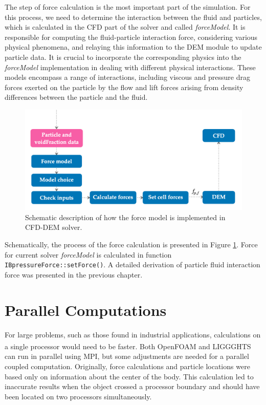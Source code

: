 The step of force calculation is the most important part of the simulation. For this process, we need to determine the interaction between the fluid and particles, which is calculated in the CFD part of the solver and called \textit{forceModel}. It is responsible for computing the fluid-particle interaction force, considering various physical phenomena, and relaying this information to the DEM module to update particle data. It is crucial to incorporate the corresponding physics into the \textit{forceModel} implementation in dealing with different physical interactions. These models encompass a range of interactions, including viscous and pressure drag forces exerted on the particle by the flow and lift forces arising from density differences between the particle and the fluid. 

\begin{figure}[!ht]
    \centering
    \includegraphics[width=15cm]{GWU_Thesis_Sarmakeeva/Images/chap3/force_model.png}
    \caption{Schematic description of how the force model is implemented in CFD-DEM solver.}
    \label{fig:force-model}
\end{figure}
Schematically, the process of the force calculation is presented in Figure \ref{fig:force-model}. Force for current solver \textit{forceModel} is calculated in function \verb|IBpressureForce::setForce()|. A detailed derivation of particle fluid interaction force was presented in the previous chapter. 


\section{Parallel Computations}

For large problems, such as those found in industrial applications, calculations on a single processor would need to be faster. Both OpenFOAM \textsuperscript{\textregistered} and LIGGGHTS \textsuperscript{\textregistered} can run in parallel using MPI, but some adjustments are needed for a parallel coupled computation. Originally, force calculations and particle locations were based only on information about the center of the body. This calculation led to inaccurate results when the object crossed a processor boundary and should have been located on two processors simultaneously.

